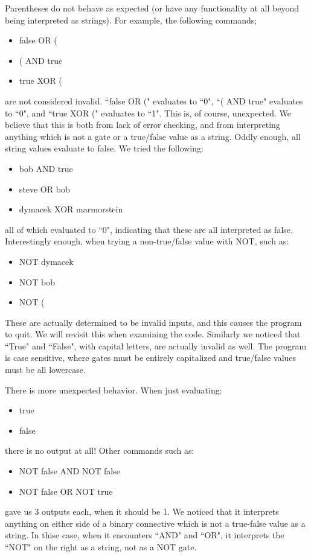 \documentclass[11pt]{article}
\begin{document}
    Parentheses do not behave as expected (or have any functionality at all beyond being interpreted as strings). For example, the following commands;
    \begin{itemize}
        \item false OR (
        \item ( AND true
        \item true XOR (
    \end{itemize}
	are not considered invalid. ``false OR (" evaluates to ``0", ``( AND true" evaluates to ``0", and ``true XOR (" evaluates to ``1". This is, of course, unexpected. We believe that this is both from lack of error checking, and from interpreting anything which is not a gate or a true/false value as a string. Oddly enough, all string values evaluate to false. We tried the following:
    \begin{itemize}
        \item bob AND true
        \item steve OR bob
        \item dymacek XOR marmorstein
    \end{itemize}
	all of which evaluated to ``0", indicating that these are all interpreted as false. Interestingly enough, when trying a non-true/false value with NOT, such as:
    \begin{itemize}
        \item NOT dymacek
        \item NOT bob
        \item NOT (
    \end{itemize}
	These are actually determined to be invalid inputs, and this causes the program to quit. We will revisit this when examining the code. Similarly we noticed that ``True" and ``False", with capital letters, are actually invalid as well. The program is case sensitive, where gates must be entirely capitalized and true/false values must be all lowercase.

	There is more unexpected behavior. When just evaluating:
    \begin{itemize}
        \item true
        \item false
    \end{itemize}
    there is no output at all! Other commands such as:
    \begin{itemize}
        \item NOT false AND NOT false
		\item NOT false OR NOT true
    \end{itemize}
	gave us 3 outputs each, when it should be 1. We noticed that it interprets anything on either side of a binary connective which is not a true-false value as a string. In thise case, when it encounters ``AND" and ``OR", it interprets the ``NOT" on the right as a string, not as a NOT gate.
\end{document}
